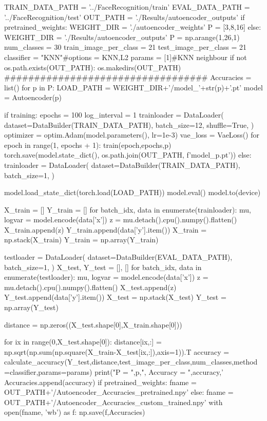 \documentclass{article}
\begin{document}
\begin{python}
TRAIN_DATA_PATH =  '../FaceRecognition/train'
EVAL_DATA_PATH = '../FaceRecognition/test'
OUT_PATH = './Results/autoencoder_outputs'
if pretrained_weights:
	WEIGHT_DIR = './autoencoder_weights'
	P = [3,8,16]
else:
	WEIGHT_DIR = './Results/autoencoder_outputs'
	P = np.arange(1,26,1)
num_classes = 30
train_image_per_class = 21
test_image_per_class = 21
classifier = "KNN"#options = KNN,L2
params = [1]#KNN neighbour
if not os.path.exists(OUT_PATH):
	os.makedirs(OUT_PATH)
##################################
Accuracies = list()
for p in P:
	LOAD_PATH = WEIGHT_DIR+'/model_'+str(p)+'.pt'
	model = Autoencoder(p)

	if training:
		epochs = 100
		log_interval = 1
		trainloader = DataLoader(
			dataset=DataBuilder(TRAIN_DATA_PATH),
			batch_size=12,
			shuffle=True,
		)
		optimizer = optim.Adam(model.parameters(), lr=1e-3)
		vae_loss = VaeLoss()
		for epoch in range(1, epochs + 1):
			train(epoch,epochs,p)
		torch.save(model.state_dict(), os.path.join(OUT_PATH, f'model_{p}.pt'))
	else:
		trainloader = DataLoader(
			dataset=DataBuilder(TRAIN_DATA_PATH),
			batch_size=1,
		)

		model.load_state_dict(torch.load(LOAD_PATH))
		model.eval()
		model.to(device)

		X_train = []
		Y_train = []
		for batch_idx, data in enumerate(trainloader):
			mu, logvar = model.encode(data['x'])
			z = mu.detach().cpu().numpy().flatten()
			X_train.append(z)
			Y_train.append(data['y'].item())
		X_train = np.stack(X_train)
		Y_train = np.array(Y_train)

		testloader = DataLoader(
			dataset=DataBuilder(EVAL_DATA_PATH),
			batch_size=1,
		)
		X_test, Y_test = [], []
		for batch_idx, data in enumerate(testloader):
			mu, logvar = model.encode(data['x'])
			z = mu.detach().cpu().numpy().flatten()
			X_test.append(z)
			Y_test.append(data['y'].item())
		X_test = np.stack(X_test)
		Y_test = np.array(Y_test)

		distance = np.zeros((X_test.shape[0],X_train.shape[0]))

		for ix in range(0,X_test.shape[0]):
			distance[ix,:] = np.sqrt(np.sum(np.square(X_train-X_test[ix,:]),axis=1)).T
		accuracy = calculate_accuracy(Y_test,distance,test_image_per_class,num_classes,method=classifier,params=params)
		print("P = ",p,", Accuracy = ",accuracy,'%
		Accuracies.append(accuracy)
	if pretrained_weights:
		fname = OUT_PATH+'/Autoencoder_Accuracies_pretrained.npy'
	else:
		fname = OUT_PATH+'/Autoencoder_Accuracies_custom_trained.npy'
	with open(fname, 'wb') as f:
		np.save(f,Accuracies)

\end{python}
\end{document}
